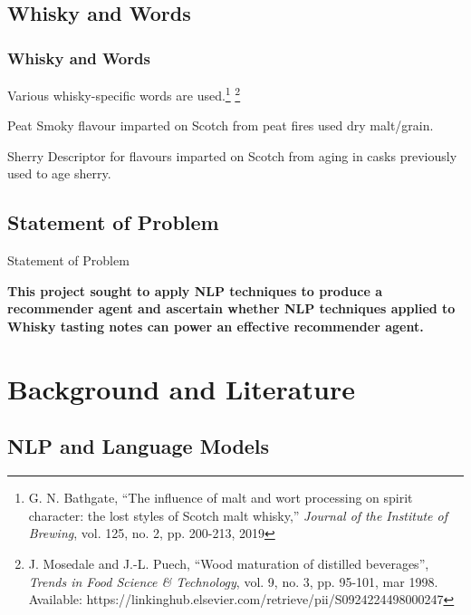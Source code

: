 \documentclass{beamer}
\begin{document}
\subsection{Whisky and Words}

\begin{frame}
    \frametitle{Whisky and Words}
    Various whisky-specific words are used.\footnote{
        G. N. Bathgate, ``The influence of malt and wort processing on spirit character: the lost styles of
    Scotch malt whisky,'' \emph{Journal of the Institute of Brewing}, vol. 125, no. 2, pp. 200-213, 2019}
    \footnote{J. Mosedale and J.-L. Puech, ``Wood maturation of distilled beverages'', \emph{Trends in
    Food Science \& Technology}, vol. 9, no. 3, pp. 95-101, mar 1998. Available:
    https://linkinghub.elsevier.com/retrieve/pii/S0924224498000247}
    
    \begin{block}{Peat}
    Smoky flavour imparted on Scotch from peat fires used dry malt/grain.
    \end{block}

    \begin{block}{Sherry}
    Descriptor for flavours imparted on Scotch from aging in casks previously used to age sherry.
    \end{block}
\end{frame}

\subsection{Statement of Problem}

\begin{frame}{Statement of Problem}

    \textbf{This project sought to apply NLP techniques to produce a recommender agent and ascertain whether
    NLP techniques applied to Whisky tasting notes can power an effective recommender agent.}
\end{frame}

\section{Background and Literature} 

\subsection{NLP and Language Models}
\end{document}

